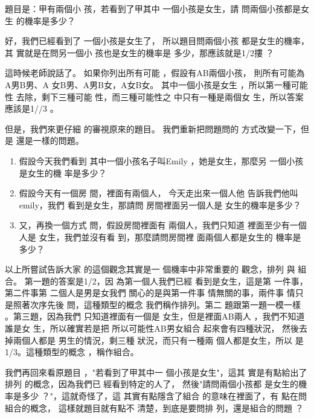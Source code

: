 \documentclass[12pt]{article}
\begin{document}
題目是：甲有兩個小%
孩，若看到了甲其中%
一個小孩是女生，請%
問兩個小孩都是女生%
的機率是多少？

\bigskip

好，我們已經看到了%
一個小孩是女生了，%
所以題目問兩個小孩%
都是女生的機率，其%
實就是在問另一個小%
孩也是女生的機率是%
多少，那應該就是1/2摟%
？

\bigskip

這時候老師說話了。%
如果你列出所有可能%
，假設有AB兩個小孩，%
則所有可能為A男B男、A%
女B男、A男B女，A女B女。%
其中一個小孩是女生%
，所以第一種可能性%
去除，剩下三種可能%
性，而三種可能性之%
中只有一種是兩個女%
生，所以答案應該是1//3%
。

\bigskip

但是，我們來更仔細%
的審視原來的題目。%
我們重新把問題問的%
方式改變一下，但是%
還是一樣的問題。

\begin{enumerate}
\item 假設今天我們看到%
其中一個小孩名子叫Emily%
，她是女生，那麼另%
一個小孩是女生的機%
率是多少？

\item 假設今天有一個房%
間，裡面有兩個人，%
今天走出來一個人他%
告訴我們他叫emily，我們%
看到是女生，那請問%
房間裡面另一個人是%
女生的機率是多少？

\item 又，再換一個方式%
問，假設房間裡面有%
兩個人，我們只知道%
裡面至少有一個人是%
女生，我們並沒有看%
到，那麼請問房間裡%
面兩個人都是女生的%
機率是多少？
\end{enumerate}

\bigskip

以上所嘗試告訴大家%
的這個觀念其實是一%
個機率中非常重要的%
觀念，排列 與 組合。%
第一題的答案是1/2，因%
為第一個人我們已經%
看到是女生，這是第%
一件事，第二件事第%
二個人是男是女我們%
關心的是與第一件事%
情無關的事，兩件事%
情只是照著次序先後%
問，這種類型的概念%
我們稱作排列。第二%
題跟第一題一模一樣%
。第三題，因為我們%
只知道裡面有一個是%
女生，但是裡面AB兩人%
，我們不知道誰是女%
生，所以確實若是把%
所以可能性AB男女組合%
起來會有四種狀況，%
然後去掉兩個人都是%
男生的情況，剩三種%
狀況，而只有一種兩%
個人都是女生，所以%
是1/3。這種類型的概念%
，稱作組合。

\bigskip

我們再回來看原題目%
，"若看到了甲其中一%
個小孩是女生"，這其%
實是有點給出了排列%
的概念，因為我們已%
經看到特定的人了，%
然後"請問兩個小孩都%
是女生的機率是多少%
？"，這就奇怪了，這%
其實有點隱含了組合%
的意味在裡面了，有%
點在問組合的概念，%
這樣就題目就有點不%
清楚，到底是要問排%
列，還是組合的問題%
？
\end{document}
